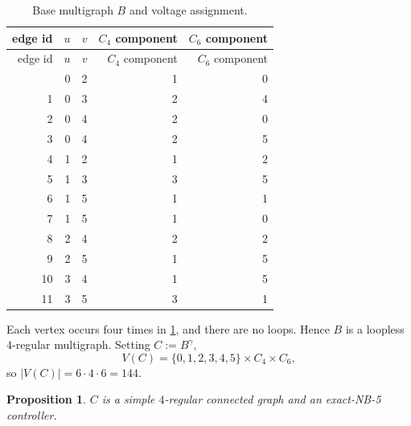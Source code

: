 \documentclass[11pt]{article}
\newtheorem{proposition}[theorem]{Proposition}
\theoremstyle{definition}
\theoremstyle{remark}
\renewcommand{\_}{\textunderscore\allowbreak}
\begin{document}
{\centering
\begin{longtable}{rrrrr}
\caption{Base multigraph \(B\) and voltage assignment.}\label{tab:base}\\
\toprule
edge id & \(u\) & \(v\) & \(C_4\) component & \(C_6\) component \\
\midrule
\endfirsthead
\toprule
edge id & \(u\) & \(v\) & \(C_4\) component & \(C_6\) component \\
\midrule
\endhead
\bottomrule
\endlastfoot
0 & 0 & 2 & 1 & 0 \\
\midrule
1 & 0 & 3 & 2 & 4 \\
\midrule
2 & 0 & 4 & 2 & 0 \\
\midrule
3 & 0 & 4 & 2 & 5 \\
\midrule
4 & 1 & 2 & 1 & 2 \\
\midrule
5 & 1 & 3 & 3 & 5 \\
\midrule
6 & 1 & 5 & 1 & 1 \\
\midrule
7 & 1 & 5 & 1 & 0 \\
\midrule
8 & 2 & 4 & 2 & 2 \\
\midrule
9 & 2 & 5 & 1 & 5 \\
\midrule
10 & 3 & 4 & 1 & 5 \\
\midrule
11 & 3 & 5 & 3 & 1 \\
\end{longtable}
}

Each vertex occurs four times in \cref{tab:base}, and there are no loops.
Hence \(B\) is a loopless \(4\)-regular multigraph. Setting
\(C:=B^\gamma\), \[
  V(C)=\{0,1,2,3,4,5\}\times C_4\times C_6 ,
\] so \(|V(C)|=6\cdot4\cdot6=144\).

\begin{proposition}\label{prop:controller}
\(C\) is a simple \(4\)-regular connected
graph and an exact-NB-5 controller.
\end{proposition}
\end{document}

